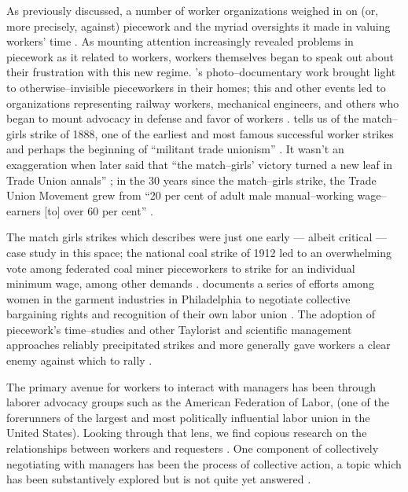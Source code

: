 \documentclass[trackingWork]{subfiles}
\begin{document}
As previously discussed, a number of worker organizations weighed in on
(or, more precisely, against) piecework and the myriad oversights it made in valuing workers' time
\cite{american1921problem,richards1904anything}.
As mounting attention increasingly revealed problems in piecework as it related to workers,
workers themselves began to speak out about their frustration with this new regime.
\citeauthor{riisOtherSideLives}'s photo--documentary work
brought light to otherwise--invisible pieceworkers in their homes;
this and other events led to organizations representing
railway workers, mechanical engineers, and others
who began to mount advocacy in defense and favor of workers
\cite{american1921problem,richards1904anything,riisOtherSideLives}.
\citeauthor{10.2307/3827491} tells us of the match--girls strike of 1888,
one of the earliest and most famous successful worker strikes and perhaps
the beginning of ``militant trade unionism''
\cite{10.2307/3827491}.
It wasn't an exaggeration when \citeauthor{weyer1894history} later said that
``the match--girls' victory turned a new leaf in Trade Union annals'' \cite{weyer1894history};
in the 30 years since the match--girls strike,
the Trade Union Movement grew from
``20 per cent of adult male manual--working wage--earners [to] over 60 per cent''
\cite{webb1920history}.


The match girls strikes which \citeauthor{10.2307/3827491} describes were just one early
--- albeit critical ---
case study in this space;
the national coal strike of 1912 led to an overwhelming vote among federated coal miner pieceworkers
to strike for
an individual minimum wage, among other demands
\cite{10.2307/2221944}.
\citeauthor{10.2307/41829256} documents a series of efforts among women in the garment industries in Philadelphia to negotiate collective bargaining rights and recognition of their own labor union
\cite{10.2307/41829256}.
The adoption of piecework's time--studies and other Taylorist and scientific management approaches reliably precipitated strikes and more generally gave workers a clear enemy against which to rally
\cite{jacoby1983union}.


The primary avenue for workers to interact with managers has been through
laborer advocacy groups such as the American Federation of Labor,
(one of the forerunners of the largest and
most politically influential labor union in the United States).
Looking through that lens, we find copious research on
the relationships between workers and requesters
\cite{levi2009union,ahlquist2013interest,
      mccallum2013global,jacoby1983union}.
One component of collectively negotiating with managers has been the process
of collective action, a topic which has been substantively explored
but is not quite yet answered
\cite{russell1982collective,olsonlogic}.
\end{document}
